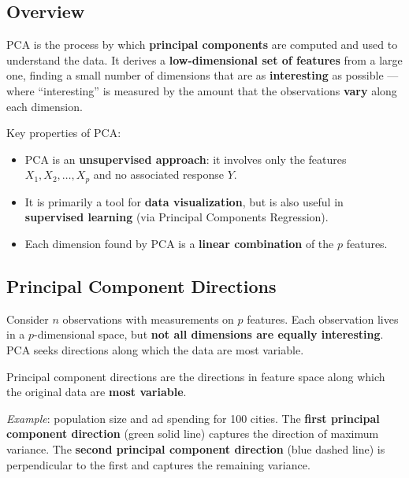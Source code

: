 \documentclass[11pt,a4paper]{article}
\theoremstyle{definition}
\theoremstyle{plain}
\theoremstyle{remark}
\begin{document}
\subsection{Overview}

\begin{tcolorbox}[colback=blue!5!white,colframe=blue!75!black,title=\textbf{Principal Components Analysis (PCA)}]
PCA is the process by which \textbf{principal components} are computed and used to understand the data. It derives a \textbf{low-dimensional set of features} from a large one, finding a small number of dimensions that are as \textbf{interesting} as possible — where ``interesting'' is measured by the amount that the observations \textbf{vary} along each dimension.
\end{tcolorbox}

Key properties of PCA:
\begin{itemize}
    \item PCA is an \textbf{unsupervised approach}: it involves only the features $X_1, X_2, \ldots, X_p$ and no associated response $Y$.
    \item It is primarily a tool for \textbf{data visualization}, but is also useful in \textbf{supervised learning} (via Principal Components Regression).
    \item Each dimension found by PCA is a \textbf{linear combination} of the $p$ features.
\end{itemize}

\subsection{Principal Component Directions}

Consider $n$ observations with measurements on $p$ features. Each observation lives in a $p$-dimensional space, but \textbf{not all dimensions are equally interesting}. PCA seeks directions along which the data are most variable.

\begin{tcolorbox}[colback=blue!5!white,colframe=blue!75!black,title=\textbf{Principal Component Directions}]
Principal component directions are the directions in feature space along which the original data are \textbf{most variable}.
\end{tcolorbox}

\textit{Example}: population size and ad spending for 100 cities. The \textbf{first principal component direction} (green solid line) captures the direction of maximum variance. The \textbf{second principal component direction} (blue dashed line) is perpendicular to the first and captures the remaining variance.
\end{document}
